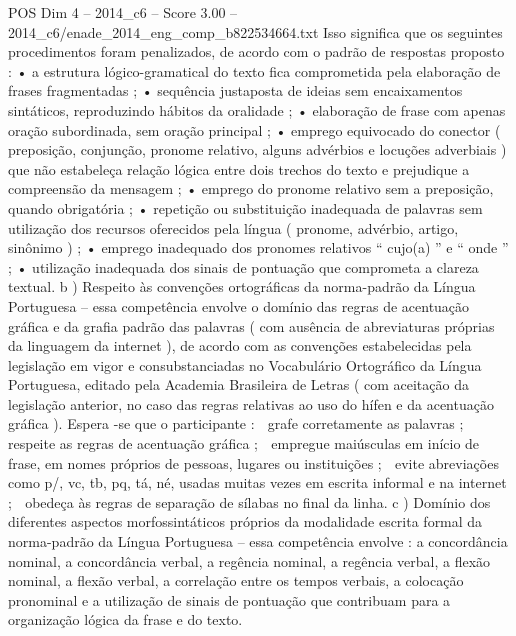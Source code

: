 \begin{textsample}{POS Dim 4 – 2014\_c6 – Score 3.00 – 2014\_c6/enade\_2014\_eng\_comp\_b822534664.txt}
Isso significa que os seguintes procedimentos foram penalizados, de acordo com o padrão de respostas proposto : • a estrutura lógico-gramatical do texto fica comprometida pela elaboração de frases fragmentadas ; • sequência justaposta de ideias sem encaixamentos sintáticos, reproduzindo hábitos da oralidade ; • elaboração de frase com apenas oração subordinada, sem oração principal ; • emprego equivocado do conector ( preposição, conjunção, pronome relativo, alguns advérbios e locuções adverbiais ) que não estabeleça relação lógica entre dois trechos do texto e prejudique a compreensão da mensagem ; • emprego do pronome relativo sem a preposição, quando obrigatória ; • repetição ou substituição inadequada de palavras sem utilização dos recursos oferecidos pela língua ( pronome, advérbio, artigo, sinônimo ) ; • emprego inadequado dos pronomes relativos “ cujo(a) ” e “ onde ” ; • utilização inadequada dos sinais de pontuação que comprometa a clareza textual. b ) Respeito às convenções ortográficas da norma-padrão da Língua Portuguesa – essa competência envolve o domínio das regras de acentuação gráfica e da grafia padrão das palavras ( com ausência de abreviaturas próprias da linguagem da internet ), de acordo com as convenções estabelecidas pela legislação em vigor e consubstanciadas no Vocabulário Ortográfico da Língua Portuguesa, editado pela Academia Brasileira de Letras ( com aceitação da legislação anterior, no caso das regras relativas ao uso do hífen e da acentuação gráfica ).
Espera -se que o participante :  grafe corretamente as palavras ;  respeite as regras de acentuação gráfica ;  empregue maiúsculas em início de frase, em nomes próprios de pessoas, lugares ou instituições ;  evite abreviações como p/, vc, tb, pq, tá, né, usadas muitas vezes em escrita informal e na internet ;  obedeça às regras de separação de sílabas no final da linha. c ) Domínio dos diferentes aspectos morfossintáticos próprios da modalidade escrita formal da norma-padrão da Língua Portuguesa – essa competência envolve : a concordância nominal, a concordância verbal, a regência nominal, a regência verbal, a flexão nominal, a flexão verbal, a correlação entre os tempos verbais, a colocação pronominal e a utilização de sinais de pontuação que contribuam para a organização lógica da frase e do texto.

\end{textsample}
